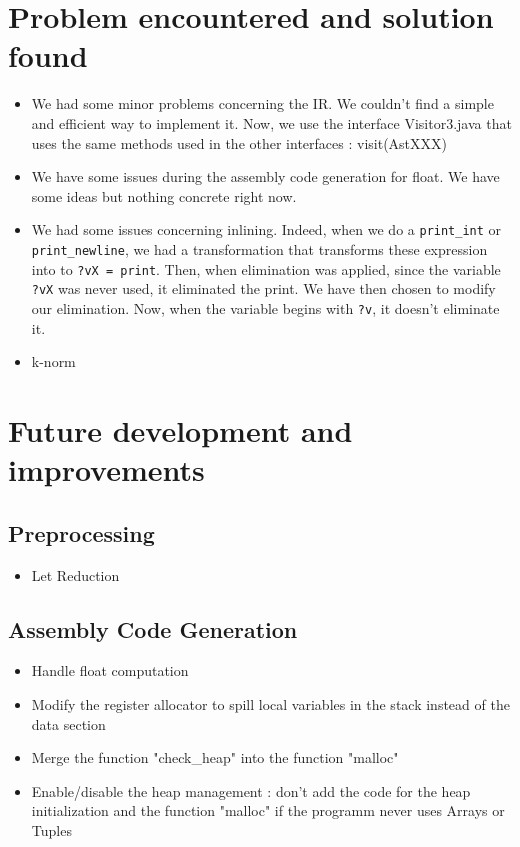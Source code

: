 \documentclass[a4paper,10pt]{article}
\begin{document}
\section{Problem encountered and solution found}
\begin{itemize}
	\item We had some minor problems concerning the IR. We couldn't find 
		  a simple and efficient way to implement it. Now, we use the interface 				Visitor3.java
		  that uses the same methods used in the other interfaces : visit(AstXXX)
	\item We have some issues during the assembly code generation for float. We have some ideas but nothing concrete right now.
    \item We had some issues concerning inlining. Indeed, when we do a \texttt{print\_int} or \texttt{print\_newline}, we had a transformation that transforms these expression into to \texttt{?vX = print}. Then, when elimination was applied, since the variable \texttt{?vX} was never used, it eliminated the print. We have then chosen to modify our elimination. Now, when the variable begins with \texttt{?v}, it doesn't eliminate it. 
    \item k-norm
\end{itemize}

\section{Future development and improvements}

\subsection{Preprocessing}
\begin{itemize}
 \item Let Reduction
\end{itemize}

\subsection{Assembly Code Generation}
\begin{itemize}
	\item Handle float computation
    \item Modify the register allocator to spill local variables in the stack instead of the data section
    \item Merge the function "check\_heap" into the function "malloc"
    \item Enable/disable the heap management : don't add the code for the heap initialization and the function "malloc" if the programm never uses Arrays or Tuples
    
    
\end{itemize}
\end{document}
